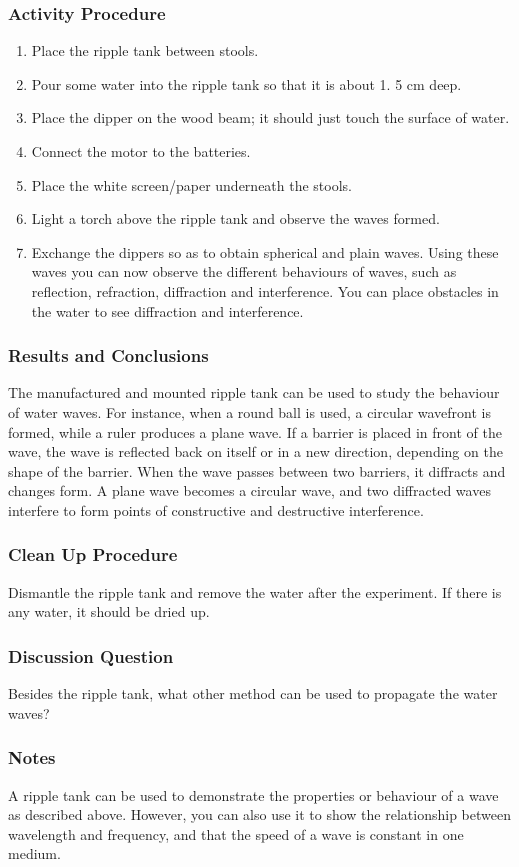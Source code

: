 \subsubsection*{Activity Procedure}
\begin{enumerate}
\item{Place the ripple tank between stools.} 
\item{Pour some water into the ripple tank so that it is about 1.  5 cm deep.} 
\item{Place the dipper on the wood beam; it should just touch the surface of water.} 
\item{Connect the motor to the batteries.} 
\item{Place the white screen/paper underneath the stools.} 
\item{Light a torch above the ripple tank and observe the waves formed.} 
\item{Exchange the dippers so as to obtain spherical and plain waves. Using these waves you can now observe the different behaviours of waves, such as reflection, refraction, diffraction and interference. You can place obstacles in the water to see diffraction and interference.} 
\end{enumerate}

\subsubsection*{Results and Conclusions}
The manufactured and mounted ripple tank can be used to study the behaviour of water waves.  For instance, when a round ball is used, a circular wavefront is formed, while a ruler produces a plane wave.  If a barrier is placed in front of the wave, the wave is reflected back on itself or in a new direction, depending on the shape of the barrier.  When the wave passes between two barriers, it diffracts and changes form.  A plane wave becomes a circular wave, and two diffracted waves interfere to form points of constructive and destructive interference.

\subsubsection*{Clean Up Procedure}
Dismantle the ripple tank and remove the water after the experiment. If there is any water, it should be dried up.

\subsubsection*{Discussion Question}
Besides the ripple tank, what other method can be used to propagate the water waves?

\subsubsection*{Notes}
A ripple tank can be used to demonstrate the properties or behaviour of a wave as described above.  However, you can also use it to show the relationship between wavelength and frequency, and that the speed of a wave is constant in one medium.
